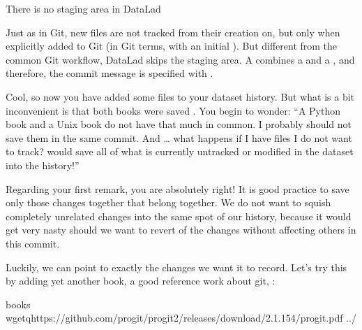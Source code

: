 \ignorespaces \begin{gitusernote}[label={index-9}, before title={\thetcbcounter\ }, float, floatplacement=tb, check odd page=true]{There is no staging area in DataLad}
\label{\detokenize{basics/101-102-populate:index-9}}

\sphinxAtStartPar
Just as in Git, new files are not tracked from their creation on, but only when
explicitly added to Git (in Git terms, with an initial ). But different
from the common Git workflow, DataLad skips the staging area. A 
combines a  and a , and therefore, the commit message
is specified with .


\end{gitusernote}

\sphinxAtStartPar
Cool, so now you have added some files to your dataset history. But what is a bit
inconvenient is that both books were saved . You begin to wonder: “A Python
book and a Unix book do not have that much in common. I probably should not save them
in the same commit. And … what happens if I have files I do not want to track?
 would save all of what is currently
untracked or modified in the dataset into the history!”

\sphinxAtStartPar
Regarding your first remark, you are absolutely right!
It is good practice to save only those changes
together that belong together. We do not want to squish completely unrelated changes
into the same spot of our history, because it would get very nasty should we want to
revert  of the changes without affecting others in this commit.

\sphinxAtStartPar
Luckily, we can point  to exactly the changes we want it to record.
Let’s try this by adding yet another book, a good reference work about git,
:

\begin{sphinxVerbatim}[commandchars=\\\{\}]
books
wget\PYGZhy{}qhttps://github.com/progit/progit2/releases/download/2.1.154/progit.pdf
../
\end{sphinxVerbatim}

